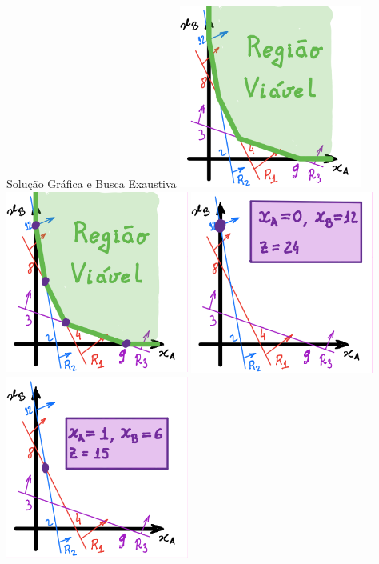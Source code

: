\documentclass{beamer}
\begin{document}
\begin{frame}
\begin{columns}
\begin{column}{0.6\textwidth}
\begin{block}{Solução Gráfica e Busca Exaustiva}
{				}
				\only<5>
				{
					\includegraphics[width=6cm,height=6cm]{Nutri_5.png}
				}
				\only<6>
				{
					\includegraphics[width=6cm,height=6cm]{Nutri_6.png}
				}
				\only<7>
				{
					\includegraphics[width=6cm,height=6cm]{Nutri_7.png}
				}
				\only<8>
				{
					\includegraphics[width=6cm,height=6cm]{Nutri_8.png}
}
\end{block}
\end{column}
\end{columns}
\end{frame}
\end{document}
